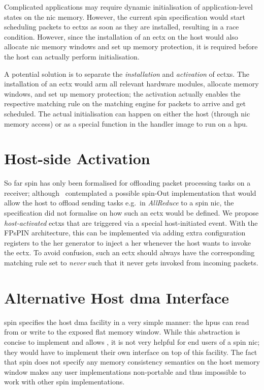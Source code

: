 Complicated applications may require dynamic initialisation of application-level states on the \ac{nic} memory.  However, the current \ac{spin} specification would start scheduling packets to \ac{ectx}s as soon as they are installed, resulting in a race condition.  However, since the installation of an \ac{ectx} on the host would also allocate \ac{nic} memory windows and set up memory protection, it is required before the host can actually perform initialisation.

A potential solution is to separate the \emph{installation} and \emph{activation} of \ac{ectx}s.  The installation of an \ac{ectx} would arm all relevant hardware modules, allocate memory windows, and set up memory protection; the activation actually enables the respective matching rule on the matching engine for packets to arrive and get scheduled.  The actual initialisation can happen on either the host (through \ac{nic} memory access) or as a special function in the handler image to run on a \ac{hpu}.

\section{Host-side Activation}

So far \ac{spin} has only been formalised for offloading packet processing tasks on a receiver; although~\cite{di_girolamo_network-accelerated_2019} contemplated a possible \ac{spin}-Out implementation that would allow the host to offload sending tasks e.g.\ in \emph{AllReduce} to a \ac{spin} \ac{nic}, the specification did not formalise on how such an \ac{ectx} would be defined.  We propose \emph{host-activated} \ac{ectx}s that are triggered via a special host-initiated event.  With the FPsPIN architecture, this can be implemented via adding extra configuration registers to the \ac{her} generator to inject a \ac{her} whenever the host wants to invoke the \ac{ectx}.  To avoid confusion, such an \ac{ectx} should always have the corresponding matching rule set to \emph{never} such that it never gets invoked from incoming packets.

\section{Alternative Host \acs{dma} Interface} \label{sec:streaming-host-dma}

\ac{spin} specifies the host \ac{dma} facility in a very simple manner: the \ac{hpu}s can read from or write to the exposed flat memory window.  While this abstraction is concise to implement and allows , it is not very helpful for end users of a \ac{spin} \ac{nic}; they would have to implement their own interface on top of this facility.  The fact that \ac{spin} does not specify any memory consistency semantics on the host memory window makes any user implementations non-portable and thus impossible to work with other \ac{spin} implementations.

